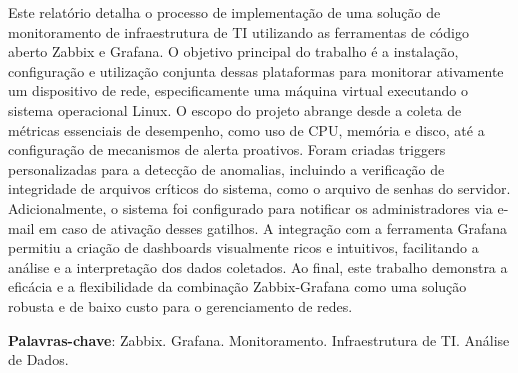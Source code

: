 
\setlength{\absparsep}{18pt} %
\begin{resumo}
Este relatório detalha o processo de implementação de uma solução de monitoramento de infraestrutura de TI utilizando as ferramentas de código aberto Zabbix e Grafana. O objetivo principal do trabalho é a instalação, configuração e utilização conjunta dessas plataformas para monitorar ativamente um dispositivo de rede, especificamente uma máquina virtual executando o sistema operacional Linux. O escopo do projeto abrange desde a coleta de métricas essenciais de desempenho, como uso de CPU, memória e disco, até a configuração de mecanismos de alerta proativos. Foram criadas triggers personalizadas para a detecção de anomalias, incluindo a verificação de integridade de arquivos críticos do sistema, como o arquivo de senhas do servidor. Adicionalmente, o sistema foi configurado para notificar os administradores via e-mail em caso de ativação desses gatilhos. A integração com a ferramenta Grafana permitiu a criação de dashboards visualmente ricos e intuitivos, facilitando a análise e a interpretação dos dados coletados. Ao final, este trabalho demonstra a eficácia e a flexibilidade da combinação Zabbix-Grafana como uma solução robusta e de baixo custo para o gerenciamento de redes.

 \textbf{Palavras-chave}: Zabbix. Grafana. Monitoramento. Infraestrutura de TI. Análise de Dados.
\end{resumo}
